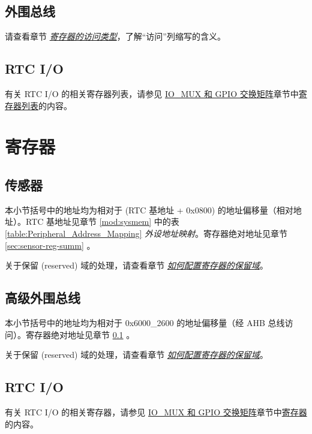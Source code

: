 \documentclass[main\_\_CN.tex]{subfiles}
\begin{document}


\subsection{外围总线}\label{sec:apb-reg-summ}

请查看章节 \hyperref[glossary-access-types]{\textit{寄存器的访问类型}}，了解“访问”列缩写的含义。



\subsection{RTC I/O}

有关 RTC I/O 的相关寄存器列表，请参见 \hyperref[mod:iomuxgpio]{IO\_MUX 和 GPIO 交换矩阵}章节中\hyperref[section:4.12]{寄存器列表}的内容。
\newpage

\section{寄存器}
\label{section:registers}

\subsection{传感器}

本小节括号中的地址均为相对于 (RTC 基地址 + 0x0800) 的地址偏移量（相对地址）。RTC 基地址见章节 \ref{mod:sysmem} \textit{} 中的表 \ref{table:Peripheral_Address_Mapping} \textit{外设地址映射}。寄存器绝对地址见章节 \ref{sec:sensor-reg-summ} \textit{}。

关于保留 (reserved) 域的处理，请查看章节 \hyperref[programming-reserved-field]{\textit{如何配置寄存器的保留域}}。



\subsection{高级外围总线}

本小节括号中的地址均为相对于 0x6000\_2600 的地址偏移量（经 AHB 总线访问）。寄存器绝对地址见章节 \ref{sec:apb-reg-summ} \textit{}。

关于保留 (reserved) 域的处理，请查看章节 \hyperref[programming-reserved-field]{\textit{如何配置寄存器的保留域}}。



\subsection{RTC I/O}

有关 RTC I/O 的相关寄存器，请参见 \hyperref[mod:iomuxgpio]{IO\_MUX 和 GPIO 交换矩阵}章节中\hyperref[section:4.13]{寄存器}的内容。
\end{document}
